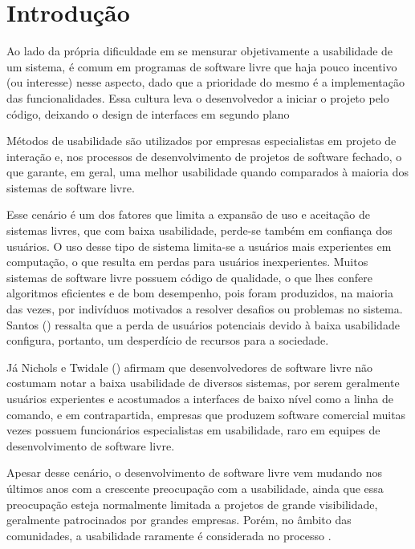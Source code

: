 \chapter{Introdução}
\label{cap-introducao}

Ao lado da própria dificuldade em se mensurar objetivamente a usabilidade de um sistema, é comum em programas de software livre que haja pouco incentivo (ou interesse) nesse aspecto, dado que a prioridade do mesmo é a implementação das funcionalidades. Essa cultura leva o desenvolvedor a iniciar o projeto pelo código, deixando o design de interfaces em segundo plano~\cite{thomas2008}
%

Métodos de usabilidade são utilizados por empresas especialistas em projeto de interação e, nos processos de desenvolvimento de projetos de software fechado, o que garante, em geral, uma melhor usabilidade quando comparados à maioria dos sistemas de software livre.
%

Esse cenário é um dos fatores que limita a expansão de uso e aceitação de sistemas livres, que com baixa usabilidade, perde-se também em confiança dos usuários. O uso desse tipo de sistema limita-se a usuários mais experientes em computação, o que resulta em perdas para usuários inexperientes. Muitos sistemas de software livre possuem código de qualidade, o que lhes confere algoritmos eficientes e de bom desempenho, pois foram produzidos, na maioria das vezes, por indivíduos motivados a resolver desafios ou problemas no sistema. Santos (\citeyear{santos2012}) ressalta que a perda de usuários potenciais devido à baixa usabilidade configura, portanto, um desperdício de recursos para a sociedade.

%
Já Nichols e Twidale (\citeyear{nichols2006}) afirmam que desenvolvedores de software livre não costumam notar a baixa usabilidade de diversos sistemas, por serem geralmente usuários experientes e acostumados a interfaces de baixo nível como a linha de comando, e em contrapartida, empresas que produzem software comercial muitas vezes possuem funcionários especialistas em usabilidade, raro em equipes de desenvolvimento de software livre.
%

Apesar desse cenário, o desenvolvimento de software livre vem mudando nos últimos anos com a crescente preocupação com a usabilidade, ainda que essa preocupação esteja normalmente limitada a projetos de grande visibilidade, geralmente patrocinados por grandes empresas. Porém, no âmbito das comunidades, a usabilidade raramente é considerada no processo \cite{nichols2006}.

